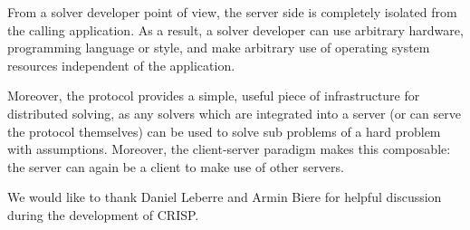 \documentclass{article}
\begin{document}
From a solver developer point of view, the server side is completely isolated
from the calling application.  As a result, a solver developer can use 
arbitrary hardware, programming language or style, and make arbitrary use of 
operating system resources independent of the application.

Moreover, the protocol provides a simple, useful piece of infrastructure for
distributed solving, as any solvers which are integrated into a server (or can
serve the protocol themselves) can be used to solve sub problems of a hard
problem with assumptions. Moreover, the client-server paradigm makes this
composable: the server can again be a client to make use of other servers.

We would like to thank Daniel Leberre and Armin Biere for helpful discussion
during the development of CRISP.


\end{document}
